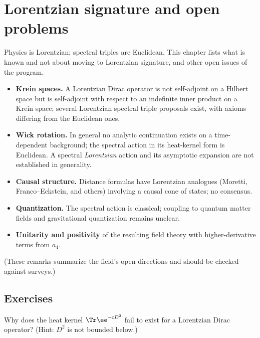 \chapter{Lorentzian signature and open problems}\label{ch:lorentzian_nc}
\skippable

\begin{physmotiv}
Physics is Lorentzian; spectral triples are Euclidean. This chapter lists what is known and not about moving to Lorentzian signature, and other open issues of the program.
\end{physmotiv}

\begin{itemize}
\item \textbf{Krein spaces.} A Lorentzian Dirac operator is not self-adjoint on a Hilbert space but is self-adjoint with respect to an indefinite inner product on a Krein space; several Lorentzian spectral triple proposals exist, with axioms differing from the Euclidean ones.
\item \textbf{Wick rotation.} In general no analytic continuation exists on a time-dependent background; the spectral action in its heat-kernel form is Euclidean. A spectral \emph{Lorentzian} action and its asymptotic expansion are not established in generality.
\item \textbf{Causal structure.} Distance formulas have Lorentzian analogues (Moretti, Franco--Eckstein, and others) involving a causal cone of states; no consensus.
\item \textbf{Quantization.} The spectral action is classical; coupling to quantum matter fields and gravitational quantization remains unclear.
\item \textbf{Unitarity and positivity} of the resulting field theory with higher-derivative terms from $a_4$.
\end{itemize}
(These remarks summarize the field's open directions and should be checked against surveys.)

\section*{Exercises}
\begin{exercise}
Why does the heat kernel $\Tr\ee^{-tD^2}$ fail to exist for a Lorentzian Dirac operator? (Hint: $D^2$ is not bounded below.)
\end{exercise}
